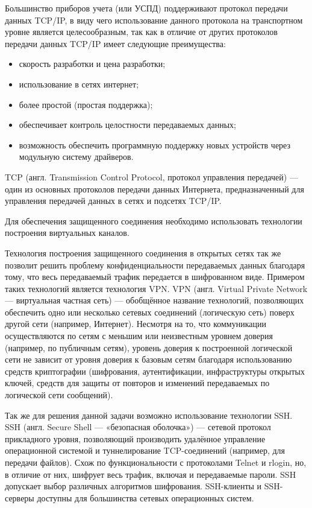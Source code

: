 Большинство приборов учета (или УСПД) поддерживают протокол передачи данных TCP/IP, в виду чего использование данного протокола на транспортном уровне является целесообразным, так как в отличие от других протоколов передачи данных TCP/IP имеет следующие преимущества:

\begin{itemize}
 \item скорость разработки и цена разработки;
 \item использование в сетях интернет;
 \item более простой (простая поддержка);
 \item обеспечивает контроль целостности передаваемых данных;
 \item возможность обеспечить программную поддержку новых устройств через модульную систему драйверов.
\end{itemize}

TCP (англ. Transmission Control Protocol, протокол управления передачей) — один из основных протоколов передачи данных Интернета, предназначенный для управления передачей данных в сетях и подсетях TCP/IP\cite{tcp}.

Для обеспечения защищенного соединения необходимо использовать технологии построения виртуальных каналов. 

Технология построения защищенного соединения в открытых сетях так же позволит решить проблему конфиденциальности передаваемых данных благодаря тому, что весь передаваемый трафик передается в шифрованном виде. Примером таких технологий является технология VPN. VPN (англ. Virtual Private Network — виртуальная частная сеть\cite{vpn}) — обобщённое название технологий, позволяющих обеспечить одно или несколько сетевых соединений (логическую сеть) поверх другой сети (например, Интернет). Несмотря на то, что коммуникации осуществляются по сетям с меньшим или неизвестным уровнем доверия (например, по публичным сетям), уровень доверия к построенной логической сети не зависит от уровня доверия к базовым сетям благодаря использованию средств криптографии (шифрования, аутентификации, инфраструктуры открытых ключей, средств для защиты от повторов и изменений передаваемых по логической сети сообщений).

Так же для решения данной задачи возможно использование технологии SSH. SSH (англ. Secure Shell — «безопасная оболочка»\cite{ssh}) — сетевой протокол прикладного уровня, позволяющий производить удалённое управление операционной системой и туннелирование TCP-соединений (например, для передачи файлов). Схож по функциональности с протоколами Telnet и rlogin, но, в отличие от них, шифрует весь трафик, включая и передаваемые пароли. SSH допускает выбор различных алгоритмов шифрования. SSH-клиенты и SSH-серверы доступны для большинства сетевых операционных систем. 


